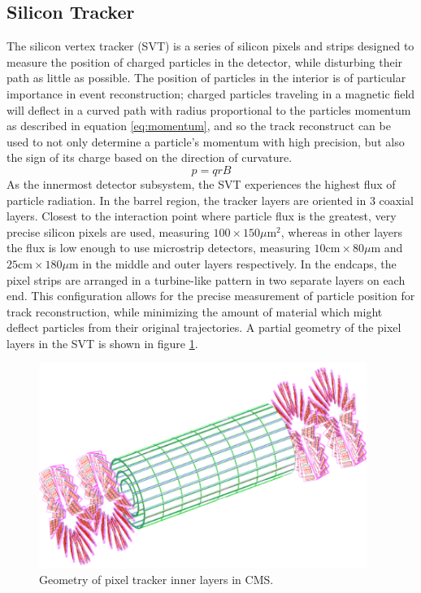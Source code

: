 \subsection{Silicon Tracker} 
\label{subsec:tracker}
The silicon vertex tracker (SVT) is a series of silicon pixels and strips designed to measure the position of charged particles in the detector, while disturbing their path as little as possible. The position of particles in the interior is of particular importance in event reconstruction; charged particles traveling in a magnetic field will deflect in a curved path with radius proportional to the particles momentum as described in equation \ref{eq:momentum}, and so the track reconstruct can be used to not only determine a particle's momentum with high precision, but also the sign of its charge based on the direction of curvature.
\begin{equation}
	\label{eq:momentum}
	p = qrB
\end{equation}
As the innermost detector subsystem, the SVT experiences the highest flux of particle radiation. In the barrel region, the tracker layers are oriented in 3 coaxial layers. Closest to the interaction point where particle flux is the greatest, very precise silicon pixels are used, measuring $100\times150 \mu \text{m}^2$, whereas in other layers the flux is low enough to use microstrip detectors, measuring $10 \text{cm}\times80\mu \text{m}$ and  $25 \text{cm}\times180\mu \text{m}$ in the middle and outer layers respectively. In the endcaps, the pixel strips are arranged in a turbine-like pattern in two separate layers on each end. This configuration allows for the precise measurement of particle position for track reconstruction, while minimizing the amount of material which might deflect particles from their original trajectories. A partial geometry of the pixel layers in the SVT is shown in figure \ref{fig:pixelLayout}.
\begin{figure}
	\centering
	\includegraphics[width=0.95\textwidth]{detector/figs/trackerGeometry}
	\renewcommand{\baselinestretch}{1.0}
	\caption[Geometry of pixel tracker inner layers in CMS.]{Geometry of pixel tracker inner layers in CMS.}
	\label{fig:pixelLayout}
\end{figure}

